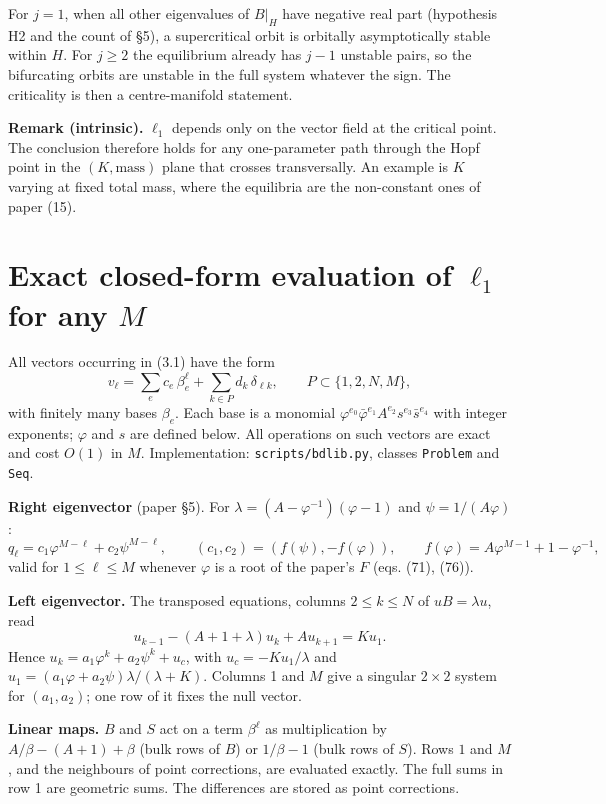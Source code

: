 \documentclass[11pt,a4paper]{report}
\begin{document}
For \(j=1\), when all other eigenvalues of \(B|_H\) have negative real part (hypothesis H2 and the count of §5), a
supercritical orbit is orbitally asymptotically stable within \(H\). For \(j\ge2\) the equilibrium
already has \(j-1\) unstable pairs, so the bifurcating orbits are unstable in the full system whatever the sign.
The criticality is then a centre-manifold statement.

\textbf{Remark (intrinsic).} \(\ell_1\) depends only on the vector field at the critical point. The conclusion therefore
holds for any one-parameter path through the Hopf point in the \((K,\text{mass})\) plane that crosses transversally.
An example is \(K\) varying at fixed total mass, where the equilibria are the non-constant ones of paper (15).

\section{\texorpdfstring{Exact closed-form evaluation of \(\ell_1\) for any \(M\)}{Exact closed-form evaluation of \textbackslash ell\_1 for any M}}

All vectors occurring in (3.1) have the form
\[v_\ell=\sum_{e} c_e\,\beta_e^{\ell}+\sum_{k\in P}d_k\,\delta_{\ell k},\qquad P\subset\{1,2,N,M\},\tag{4.1}\]
with finitely many bases \(\beta_e\). Each base is a monomial \(\varphi^{e_0}\bar\varphi^{e_1}A^{e_2}s^{e_3}\bar s^{e_4}\)
with integer exponents; \(\varphi\) and \(s\) are defined below. All operations on such vectors are exact and cost
\(O(1)\) in \(M\). Implementation: \texttt{scripts/bdlib.py}, classes \texttt{Problem} and \texttt{Seq}.

\textbf{Right eigenvector} (paper §5). For \(\lambda=(A-\varphi^{-1})(\varphi-1)\) and \(\psi=1/(A\varphi)\):
\[q_\ell=c_1\varphi^{M-\ell}+c_2\psi^{M-\ell},\qquad (c_1,c_2)=(f(\psi),-f(\varphi)),\qquad f(\varphi)=A\varphi^{M-1}+1-\varphi^{-1},\]
valid for \(1\le\ell\le M\) whenever \(\varphi\) is a root of the paper's \(F\) (eqs. (71), (76)).

\textbf{Left eigenvector.} The transposed equations, columns \(2\le k\le N\) of \(uB=\lambda u\), read
\[u_{k-1}-(A+1+\lambda)u_k+Au_{k+1}=Ku_1 .\]
Hence \(u_k=a_1\varphi^k+a_2\psi^k+u_c\), with \(u_c=-Ku_1/\lambda\) and
\(u_1=(a_1\varphi+a_2\psi)\lambda/(\lambda+K)\). Columns 1 and \(M\) give a singular \(2\times2\) system for
\((a_1,a_2)\); one row of it fixes the null vector.

\textbf{Linear maps.} \(B\) and \(S\) act on a term \(\beta^\ell\) as multiplication by \(A/\beta-(A+1)+\beta\) (bulk rows
of \(B\)) or \(1/\beta-1\) (bulk rows of \(S\)). Rows \(1\) and \(M\), and the neighbours of point corrections, are
evaluated exactly. The full sums in row 1 are geometric sums. The differences are stored as point corrections.
\end{document}
